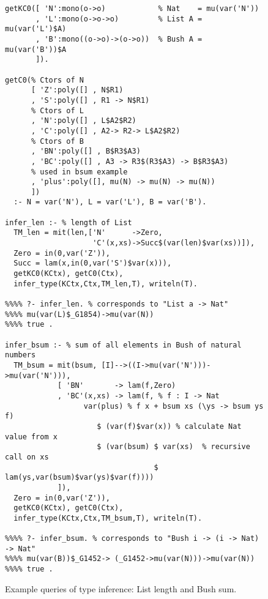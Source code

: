 \documentclass[runningheads,a4paper]{llncs}
\newcommand{\TODO}[1]{\textcolor{magenta}{TODO: #1}}
\begin{document}


\begin{figure}\small
\begin{verbatim}
getKC0([ 'N':mono(o->o)            % Nat    = mu(var('N'))
       , 'L':mono(o->o->o)         % List A = mu(var('L')$A)
       , 'B':mono((o->o)->(o->o))  % Bush A = mu(var('B'))$A
       ]).

getC0(% Ctors of N
      [ 'Z':poly([] , N$R1)
      , 'S':poly([] , R1 -> N$R1)
      % Ctors of L
      , 'N':poly([] , L$A2$R2)
      , 'C':poly([] , A2-> R2-> L$A2$R2)
      % Ctors of B
      , 'BN':poly([] , B$R3$A3)
      , 'BC':poly([] , A3 -> R3$(R3$A3) -> B$R3$A3)
      % used in bsum example
      , 'plus':poly([], mu(N) -> mu(N) -> mu(N))
      ])
  :- N = var('N'), L = var('L'), B = var('B').

infer_len :- % length of List
  TM_len = mit(len,['N'      ->Zero,
                    'C'(x,xs)->Succ$(var(len)$var(xs))]),
  Zero = in(0,var('Z')),
  Succ = lam(x,in(0,var('S')$var(x))),
  getKC0(KCtx), getC0(Ctx),
  infer_type(KCtx,Ctx,TM_len,T), writeln(T).

%%%% ?- infer_len. % corresponds to "List a -> Nat"
%%%% mu(var(L)$_G1854)->mu(var(N))
%%%% true .

infer_bsum :- % sum of all elements in Bush of natural numbers
  TM_bsum = mit(bsum, [I]-->((I->mu(var('N')))->mu(var('N'))),
            [ 'BN'       -> lam(f,Zero)
            , 'BC'(x,xs) -> lam(f, % f : I -> Nat
                  var(plus) % f x + bsum xs (\ys -> bsum ys f)
                     $ (var(f)$var(x)) % calculate Nat value from x
                     $ (var(bsum) $ var(xs)  % recursive call on xs
                                  $ lam(ys,var(bsum)$var(ys)$var(f))))
            ]),
  Zero = in(0,var('Z')),
  getKC0(KCtx), getC0(Ctx),
  infer_type(KCtx,Ctx,TM_bsum,T), writeln(T).

%%%% ?- infer_bsum. % corresponds to "Bush i -> (i -> Nat) -> Nat"
%%%% mu(var(B))$_G1452-> (_G1452->mu(var(N)))->mu(var(N))
%%%% true .
\end{verbatim}
\caption{Example queries of type inference: List length and Bush sum.}
\label{fig:TIexample}
\end{figure}
\end{document}
